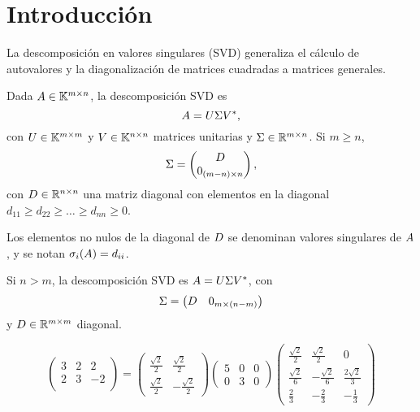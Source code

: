 \section{Introducción}

La descomposición en valores singulares (SVD) generaliza el cálculo de autovalores y la
diagonalización de matrices cuadradas a matrices generales.

\begin{definicion}
Dada $\Ab \in \K^{m \times n}$, la descomposición SVD es
$$\Ab = \Ub \Sigmab \Vb^*,$$
con $\Ub \in \K^{m \times m}$ y $\Vb \in \K^{n \times n}$
matrices unitarias y  $\Sigmab \in \R^{m \times n}$. Si $m \ge n$,
$$
\Sigmab = \begin{pmatrix} \Db \\ \cero_{(m-n) \times n}\end{pmatrix},
$$
con $\Db \in \mathbb{R}^{n \times n}$ una matriz diagonal con elementos en
la diagonal $d_{11} \ge d_{22} \ge \dots \ge d_{nn} \ge 0$.

Los elementos no nulos de la diagonal de $\Db$ se denominan valores singulares de
$\Ab$, y se notan $\sigma_i(\Ab) = d_{ii}$.

Si $n > m$, la descomposición SVD es $\Ab = \Ub \Sigmab \Vb^*$, con
$$\Sigmab = \begin{pmatrix} \Db & \cero_{m \times (n-m)} \end{pmatrix}$$
 y $\Db \in \mathbb{R}^{m \times m}$ diagonal.
\end{definicion}

\begin{ejemplo}
$$
\begin{pmatrix}
3 & 2 & 2 \\
2 & 3 & -2 \\
\end{pmatrix} = \begin{pmatrix}
\frac{\sqrt2}{2} & \frac{\sqrt2}{2} \\
\frac{\sqrt2}{2} & -\frac{\sqrt2}{2}
\end{pmatrix} \begin{pmatrix}
5 & 0 & 0 \\
0 & 3 & 0
\end{pmatrix}
\begin{pmatrix}
\frac{\sqrt2}{2} & \frac{\sqrt2}{2} & 0 \\
\frac{\sqrt2}{6} & -\frac{\sqrt2}{6} & \frac{2\sqrt2}{3} \\
\frac23 & -\frac23 & -\frac13
\end{pmatrix}
$$
\end{ejemplo}

